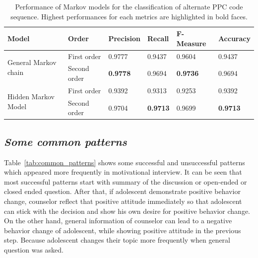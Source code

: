 \documentclass{amia}
\begin{document}
\begin{table}[h]
\centering
\caption{Performance of Markov models for the classification of alternate PPC code sequence. Highest performances for each metrics are highlighted in bold faces.}
\label{tab:result_alt_seq}
  \begin{tabular}{|l|l|l|l|l|l|}
  \hline
   \textbf{Model} & \textbf{Order}  & \textbf{Precision}  & \textbf{Recall} & \textbf{F-Measure} & \textbf{Accuracy}\\ \hline    
    
 \multirow{2}{*}{General Markov chain} & First order & 0.9777 & 0.9437 & 0.9604 & 0.9437\\\cline{2-6}
 & Second order & \textbf{0.9778} & 0.9694 & \textbf{0.9736} & 0.9694\\ \hline
 \multirow{2}{*}{Hidden Markov Model} & First order & 0.9392 & 0.9313 & 0.9253 & 0.9392\\ \cline{2-6}
 & Second order & 0.9704 & \textbf{0.9713} & 0.9699  & \textbf{0.9713}\\ \hline
 
  \end{tabular}
\end{table}

\subsection*{\textit{Some common patterns}}
Table~\ref{tab:common_patterns} shows some successful and unsuccessful patterns which appeared more frequently in motivational interview. It can be seen that most successful patterns start with summary of the discussion or open-ended or closed ended question. After that, if adolescent demonstrate positive behavior change, counselor reflect that positive attitude immediately so that adolescent can stick with the decision and show his own desire for positive behavior change. On the other hand, general information of counselor can lead to a negative behavior change of adolescent, while showing positive attitude in the previous step. Because adolescent changes their topic more frequently when general question was asked.   
\end{document}
